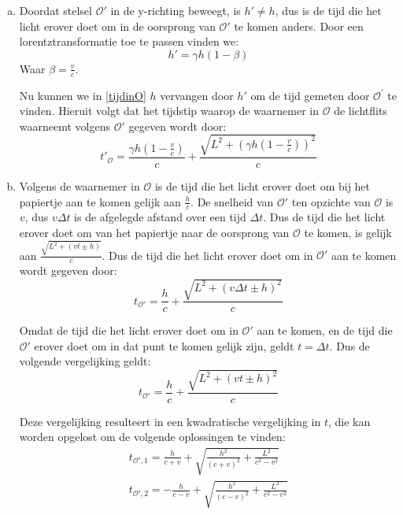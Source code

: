 \documentclass[12pt, dutch, a4paper]{article}
\begin{document}
\begin{enumerate}[(a).]
    \item \label{itemd}
    Doordat stelsel $\mathcal{O'}$ in de y-richting beweegt, is $h' \neq h$, dus is de tijd die 
    het licht erover doet om in de oorsprong van $\mathcal{O'}$ te komen anders. Door een 
    lorentztransformatie toe te passen vinden we:
    \begin{equation} \label{lorentzh}
        h' = \gamma h\left( 1-\beta\right) 
    \end{equation}
    Waar $\beta = \frac{v}{c}$.

    Nu kunnen we in \eqref{tijdinO} $h$ vervangen door $h'$ om de tijd 
    gemeten door $\mathcal{O}^{'}$ te vinden. Hieruit volgt dat het tijdstip 
    waarop de waarnemer in $\mathcal{O}$ de lichtflits waarneemt volgens $\mathcal{O'}$ gegeven wordt door:
    \begin{equation} \label{tijdinO'} 
        t'_\mathcal{O} = \frac{\gamma h\left( 1-\frac{v}{c}\right)}{c} + 
        \frac{\sqrt{L^2 + \left(\gamma h\left( 1-\frac{v}{c}\right)\right)^2}}{c}
    \end{equation}

    \item \label{iteme}
    Volgens de waarnemer in $\mathcal{O}$ is de tijd die het licht erover doet om bij
    het papiertje aan te komen gelijk aan $\frac{h}{c}$. 
    De snelheid van $\mathcal{O}'$ ten opzichte van $\mathcal{O}$ is $v$,
    dus $v \Delta t$ is de afgelegde afstand over een tijd $\Delta t$.
    Dus de tijd die het licht erover doet om van het papiertje naar de oorsprong van
    $\mathcal{O}$ te komen, is gelijk aan $\frac{\sqrt{L^2 + (vt \pm h)}}{c}$.
    Dus de tijd die het licht erover doet om in $\mathcal{O}'$ aan te komen 
    wordt gegeven door:
    \begin{equation}
        t_{\mathcal{O}'}= \frac{h}{c} + \frac{\sqrt{L^2 + \left(v \Delta t \pm h\right)^2}}{c}
    \end{equation}
    
    Omdat de tijd die het licht erover doet om in $\mathcal{O}'$ aan te komen,
    en de tijd die $\mathcal{O}'$ erover doet om in dat punt te komen gelijk zijn,
    geldt $t = \Delta t$. Dus de volgende vergelijking geldt:
    \begin{equation}
        t_{\mathcal{O}'} = \frac{h}{c} + \frac{\sqrt{L^2 + \left(vt \pm h\right)^2}}{c}
    \end{equation}

    Deze vergelijking resulteert in een kwadratische vergelijking in $t$, 
    die kan worden opgelost om de volgende oplossingen te vinden:
    \begin{equation}
        \begin{split}
            t_{\mathcal{O}',1} = \frac{h}{c + v}+\sqrt{\frac{h^{2}}{\left(c + v\right)^{2}}+\frac{L^{2}}{c^{2}-v^{2}}}\\
            t_{\mathcal{O}',2} = -\frac{h}{c - v}+\sqrt{\frac{h^{2}}{\left(c - v\right)^{2}}+\frac{L^{2}}{c^{2}-v^{2}}}  
        \end{split}
    \end{equation}
    

\end{enumerate}
\end{document}
